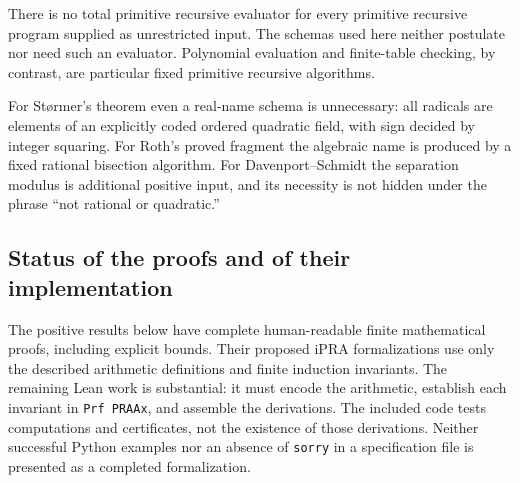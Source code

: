 There is no total primitive recursive evaluator for every primitive recursive
program supplied as unrestricted input.  The schemas used here neither
postulate nor need such an evaluator.  Polynomial evaluation and finite-table
checking, by contrast, are particular fixed primitive recursive algorithms.

For St\o rmer's theorem even a real-name schema is unnecessary: all radicals
are elements of an explicitly coded ordered quadratic field, with sign
decided by integer squaring.  For Roth's proved fragment the algebraic name is
produced by a fixed rational bisection algorithm.  For Davenport--Schmidt the
separation modulus is additional positive input, and its necessity is not
hidden under the phrase ``not rational or quadratic.''

\subsection{Status of the proofs and of their implementation}

The positive results below have complete human-readable finite mathematical
proofs, including explicit bounds.  Their proposed iPRA formalizations use
only the described arithmetic definitions and finite induction invariants.
The remaining Lean work is substantial: it must encode the arithmetic,
establish each invariant in \texttt{Prf PRAAx}, and assemble the derivations.
The included code tests computations and certificates, not the existence of
those derivations.  Neither successful Python examples nor an absence of
\texttt{sorry} in a specification file is presented as a completed
formalization.
